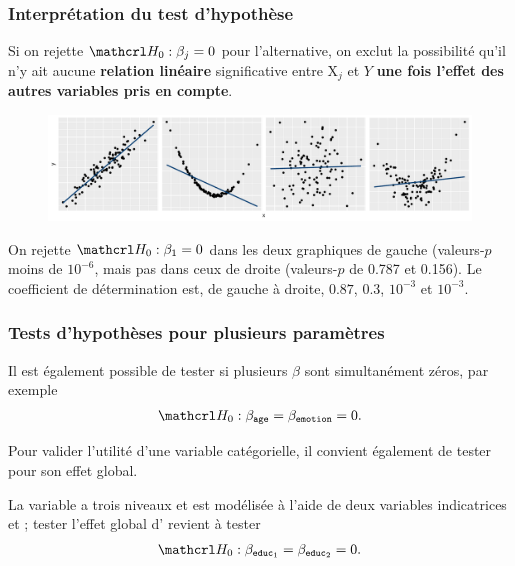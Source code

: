 \documentclass[xcolor={dvipsnames}]{beamer}
\begin{document}
\begin{frame}[fragile]
\frametitle{Interprétation du test d'hypothèse}

Si on rejette $\Hy_0: \beta_j=0$ pour l'alternative, on exclut la possibilité qu'il n'y ait aucune \textbf{relation linéaire} significative entre $\mathrm{X}_j$ et $Y$ \textbf{une fois l'effet des autres variables pris en compte}.

\begin{figure}
 \centering
 \includegraphics[width = \textwidth]{img/c2/03-linreg-fourplots}
\end{figure}
{
\footnotesize 
On rejette $\Hy_0: \beta_1 =0$ dans les deux graphiques de gauche (valeurs-$p$ moins de $10^{-6}$, mais pas dans ceux de droite (valeurs-$p$ de 0.787 et 0.156). Le coefficient de détermination est, de gauche à droite, $0.87$, $0.3$, $10^{-3}$ et $10^{-3}$.

}
\end{frame}

\begin{frame}
\frametitle{Tests d'hypothèses pour plusieurs paramètres}
\bi
\item Il est également possible de tester si \alert{plusieurs} $\beta$ sont simultanément zéros, par exemple
\begin{align*}
\Hy_0: \beta_{\code{age}}=\beta_{\code{emotion}}=0.
\end{align*}
\item Pour valider l'utilité d'une variable catégorielle, il convient également de tester pour son \alert{effet global}.
\bi 
\item La variable  a trois niveaux et est modélisée à l'aide de deux variables indicatrices  et ; tester l'effet global d' revient à tester
\begin{align*}
\Hy_0: \beta_{\code{educ}_1}=\beta_{\code{educ}_2}=0.
\end{align*}
\ei
\ei
\end{frame}
\end{document}
